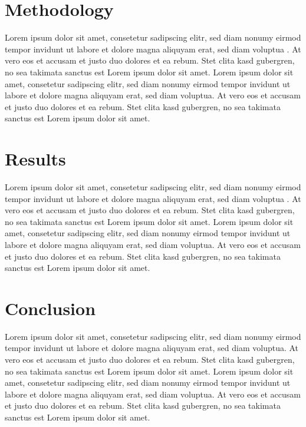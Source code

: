 \documentclass[a4paper]{article}
\begin{document}
\section{Methodology} %
\label{sec:methodology}
Lorem ipsum dolor sit amet, consetetur sadipscing elitr, sed diam nonumy eirmod tempor invidunt ut labore et dolore magna aliquyam erat, sed diam voluptua \citep{Dix04}. At vero eos et accusam et justo duo dolores et ea rebum. Stet clita kasd gubergren, no sea takimata sanctus est Lorem ipsum dolor sit amet. Lorem ipsum dolor sit amet, consetetur sadipscing elitr, sed diam nonumy eirmod tempor invidunt ut labore et dolore magna aliquyam erat, sed diam voluptua. At vero eos et accusam et justo duo dolores et ea rebum. Stet clita kasd gubergren, no sea takimata sanctus est Lorem ipsum dolor sit amet.

\section{Results} %
\label{sec:results}
Lorem ipsum dolor sit amet, consetetur sadipscing elitr, sed diam nonumy eirmod tempor invidunt ut labore et dolore magna aliquyam erat, sed diam voluptua \citep[p. 48]{Baddeley:1974ts}. At vero eos et accusam et justo duo dolores et ea rebum. Stet clita kasd gubergren, no sea takimata sanctus est Lorem ipsum dolor sit amet. Lorem ipsum dolor sit amet, consetetur sadipscing elitr, sed diam nonumy eirmod tempor invidunt ut labore et dolore magna aliquyam erat, sed diam voluptua. At vero eos et accusam et justo duo dolores et ea rebum. Stet clita kasd gubergren, no sea takimata sanctus est Lorem ipsum dolor sit amet.

\section{Conclusion} %
\label{sec:conclusion}
Lorem ipsum dolor sit amet, consetetur sadipscing elitr, sed diam nonumy eirmod tempor invidunt ut labore et dolore magna aliquyam erat, sed diam voluptua. At vero eos et accusam et justo duo dolores et ea rebum. Stet clita kasd gubergren, no sea takimata sanctus est Lorem ipsum dolor sit amet. Lorem ipsum dolor sit amet, consetetur sadipscing elitr, sed diam nonumy eirmod tempor invidunt ut labore et dolore magna aliquyam erat, sed diam voluptua. At vero eos et accusam et justo duo dolores et ea rebum. Stet clita kasd gubergren, no sea takimata sanctus est Lorem ipsum dolor sit amet.


\newpage 


\end{document}
